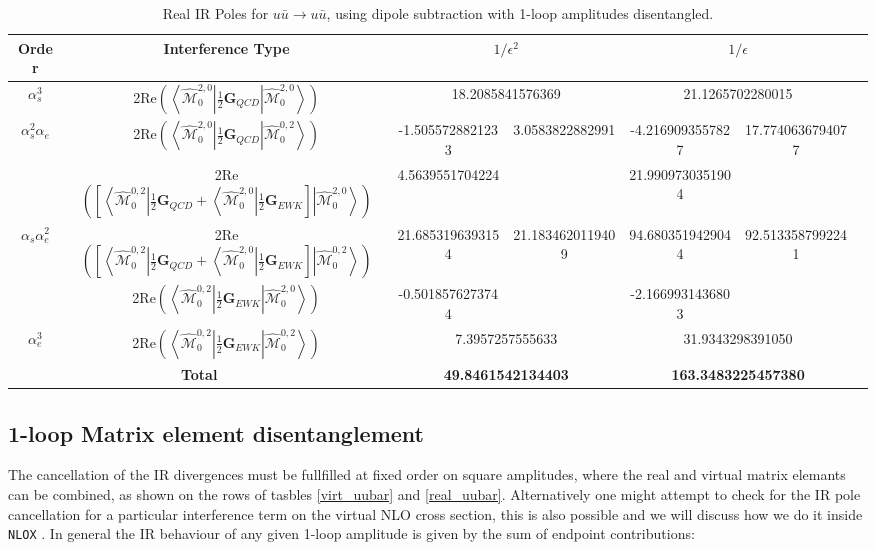 \documentclass[a4paper]{article}
\def \NLOX{\texttt{NLOX} }
\def \MBra#1#2#3{\left<\hat{\mathcal{M}}_{#1}^{#2,#3}\right|}
\def \MKet#1#2#3{\left|\hat{\mathcal{M}}_{#1}^{#2,#3}\right>}
\begin{document}
\begin{table}[]
\footnotesize
{}
\vskip0.75cm
\begin{tabular}{|c|c|c|c|c|c|c}\hline
 Order& Interference Type
 & \multicolumn{2}{c}{$1/\epsilon^{2}$} 
 & \multicolumn{2}{|c|}{$1/\epsilon$}\\\hline
 $\alpha_s^3$                           
 & 2Re$\left(\MBra{0}{2}{0}\frac{1}{2}\textbf{G}_{QCD}\MKet{0}{2}{0}\right)$
 & \multicolumn{2}{c|}{18.2085841576369} 
 & \multicolumn{2}{c|}{21.1265702280015} \\\hline
 \multirow{2}{*}{$\alpha_s^2\alpha_e$}                                                        
 & 2Re$\left(\MBra{0}{2}{0}\frac{1}{2}\textbf{G}_{QCD}\MKet{0}{0}{2}\right)$
 & -1.5055728821233 & \multirow{2}{*}{3.0583822882991} 
 & -4.2169093557827 & \multirow{2}{*}{17.7740636794077} \\
 & 2Re$
 \left(\left[
 \MBra{0}{0}{2}\frac{1}{2}\textbf{G}_{QCD}
 +
 \MBra{0}{2}{0}\frac{1}{2}\textbf{G}_{EWK}
 \right]
 \MKet{0}{2}{0}\right)$
 & 4.5639551704224 && 21.9909730351904 &\\\hline
 \multirow{2}{*}{$\alpha_s\alpha_e^2$}                                                  
 & 2Re$
 \left(\left[
 \MBra{0}{0}{2}\frac{1}{2}\textbf{G}_{QCD}
 +
 \MBra{0}{2}{0}\frac{1}{2}\textbf{G}_{EWK}
 \right]
 \MKet{0}{0}{2}\right)$
 & 21.6853196393154 & \multirow{2}{*}{21.1834620119409} 
 & 94.6803519429044 & \multirow{2}{*}{92.5133587992241} \\
 & 2Re$\left(\MBra{0}{0}{2}\frac{1}{2}\textbf{G}_{EWK}\MKet{0}{2}{0}\right)$
 & -0.5018576273744 && -2.1669931436803 &\\\hline
 $\alpha_e^3$                                                                             
 & 2Re$\left(\MBra{0}{0}{2}\frac{1}{2}\textbf{G}_{EWK}\MKet{0}{0}{2}\right)$
 & \multicolumn{2}{c|}{7.3957257555633} 
 & \multicolumn{2}{c|}{31.9343298391050} \\\hline
   \multicolumn{2}{|c|}{\textbf{Total}}     
 & \multicolumn{2}{c|}{\textbf{49.8461542134403}} 
 & \multicolumn{2}{c|}{\textbf{163.3483225457380}}\\\hline
 \end{tabular}
 \caption{Real IR Poles for $u\bar u\rightarrow u\bar u$, using dipole subtraction with 1-loop amplitudes
 disentangled.}
 \label{1loop_disentangled}
\end{table}
\restoregeometry

\subsection{1-loop Matrix element disentanglement}
The cancellation of the IR divergences must be fullfilled at fixed order on square amplitudes,
where the real and virtual matrix elemants can be combined, as shown on the rows of tasbles \ref{virt_uubar}
and \ref{real_uubar}. Alternatively one might attempt to check for the IR pole cancellation 
for a particular interference term on the virtual NLO cross section, this is also possible and 
we will discuss how we do it inside \NLOX. In general the IR behaviour of any given 1-loop amplitude 
is given by the sum of endpoint contributions:
\end{document}
